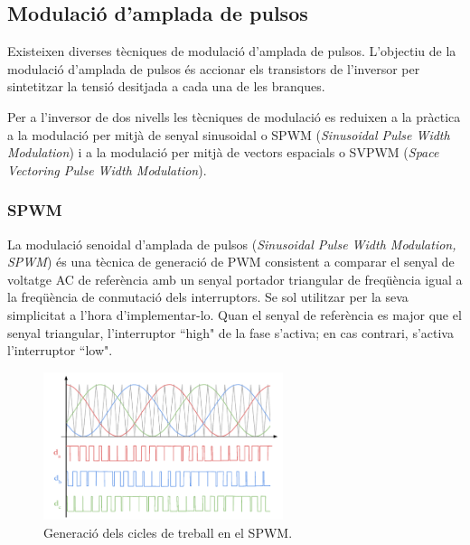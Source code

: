 \subsection{ Modulació d'amplada de pulsos }
{ 
    Existeixen diverses tècniques de modulació d'amplada de pulsos. L'objectiu
    de la modulació d'amplada de pulsos és accionar els transistors de
    l'inversor per sintetitzar la tensió desitjada a cada una de les branques.

    Per a l'inversor de dos nivells les tècniques de modulació es reduixen a
    la pràctica a la modulació per mitjà de senyal sinusoidal o SPWM
    (\emph{Sinusoidal Pulse Width Modulation}) i a la modulació per mitjà de
    vectors espacials o SVPWM (\emph{Space Vectoring Pulse Width Modulation}).

    \subsubsection{ SPWM } 
    { 
        La modulació senoidal d'amplada de pulsos (\emph{Sinusoidal Pulse Width
        Modulation, SPWM}) és una tècnica de generació de PWM consistent a
        comparar el senyal de voltatge AC de referència amb un senyal portador
        triangular de freqüència igual a la freqüència de conmutació dels
        interruptors. Se sol utilitzar per la seva simplicitat a l'hora
        d'implementar-lo. Quan el senyal de referència es major que el senyal
        triangular, l'interruptor ``high" de la fase s'activa; en cas contrari,
        s'activa l'interruptor ``low".

        \begin{figure}[!htb]
            \centering
            \captionsetup{justification=centering, margin=1.5cm}
            \includegraphics[width=7cm]
                { img/3_control_motor/spwm.pdf }
            \caption{ Generació dels cicles de treball en el SPWM.}
        \end{figure}
    }

}
